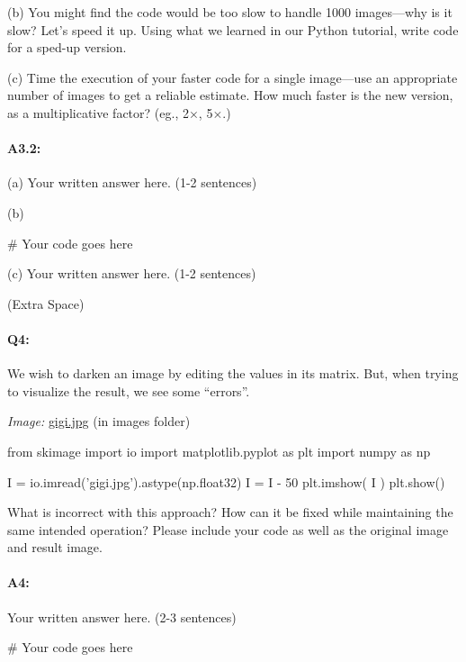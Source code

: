 \documentclass[11pt]{article}
\begin{document}
(b) You might find the code would be too slow to handle 1000 images---why is it slow? Let's speed it up. Using what we learned in our Python tutorial, write code for a sped-up version.

(c) Time the execution of your faster code for a single image---use an appropriate number of images to get a reliable estimate. How much faster is the new version, as a multiplicative factor? (eg., 2$\times$, 5$\times$.)

\paragraph{A3.2:}

(a) Your written answer here. (1-2 sentences)

(b) 
\begin{python}
# Your code goes here
\end{python}

(c) Your written answer here. (1-2 sentences)

 (Extra Space)



\pagebreak
\paragraph{Q4:} We wish to darken an image by editing the values in its matrix. But, when trying to visualize the result, we see some ``errors''.

\emph{Image:} \href{images/gigi.jpg}{gigi.jpg} (in images folder)

\begin{python}
from skimage import io
import matplotlib.pyplot as plt
import numpy as np

I =  io.imread('gigi.jpg').astype(np.float32)
I = I - 50
plt.imshow( I )
plt.show()
\end{python}

What is incorrect with this approach? How can it be fixed while maintaining the same intended operation? Please include your code as well as the original image and result image.

\paragraph{A4:} Your written answer here. (2-3 sentences)
\begin{python}
# Your code goes here
\end{python}
\end{document}
